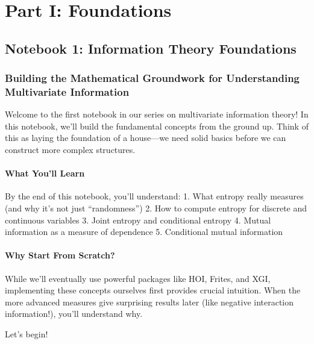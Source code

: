 \documentclass[
  11pt,
  letterpaper,
  oneside,
  openany]{book}
\begin{document}
\part{Part I: Foundations}

\chapter{Notebook 1: Information Theory
Foundations}\label{notebook-1-information-theory-foundations}

\section{Building the Mathematical Groundwork for Understanding
Multivariate
Information}\label{building-the-mathematical-groundwork-for-understanding-multivariate-information}

Welcome to the first notebook in our series on multivariate information
theory! In this notebook, we'll build the fundamental concepts from the
ground up. Think of this as laying the foundation of a house---we need
solid basics before we can construct more complex structures.

\subsection{What You'll Learn}\label{what-youll-learn-1}

By the end of this notebook, you'll understand: 1. What entropy really
measures (and why it's not just ``randomness'') 2. How to compute
entropy for discrete and continuous variables 3. Joint entropy and
conditional entropy 4. Mutual information as a measure of dependence 5.
Conditional mutual information

\subsection{Why Start From Scratch?}\label{why-start-from-scratch}

While we'll eventually use powerful packages like HOI, Frites, and XGI,
implementing these concepts ourselves first provides crucial intuition.
When the more advanced measures give surprising results later (like
negative interaction information!), you'll understand why.

Let's begin!
\end{document}
